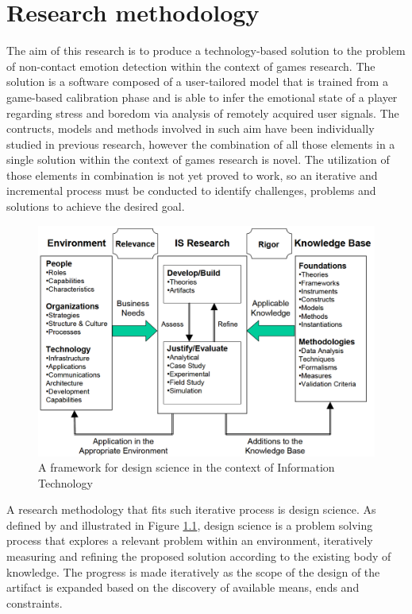 \chapter{Research methodology}

The aim of this research is to produce a technology-based solution to the problem of non-contact emotion detection within the context of games research. The solution is a software composed of a user-tailored model that is trained from a game-based calibration phase and is able to infer the emotional state of a player regarding stress and boredom via analysis of remotely acquired user signals. The contructs, models and methods involved in such aim have been individually studied in previous research, however the combination of all those elements in a single solution within the context of games research is novel. The utilization of those elements in combination is not yet proved to work, so an iterative and incremental process must be conducted to identify challenges, problems and solutions to achieve the desired goal.

\begin{figure}[h]
    \centering
    \includegraphics[width=\textwidth]{figures/hevner-research-framework.png}
    \caption{A framework for design science in the context of Information Technology \parencite{hevner2004design}}
    \label{fig:hevner-research-framework}
\end{figure}

A research methodology that fits such iterative process is design science. As defined by \textcite{hevner2004design} and illustrated in Figure \ref{fig:hevner-research-framework}, design science is a problem solving process that explores a relevant problem within an environment, iteratively measuring and refining the proposed solution according to the existing body of knowledge. The progress is made iteratively as the scope of the design of the artifact is expanded based on the discovery of available means, ends and constraints.

